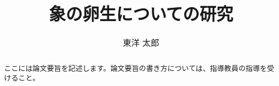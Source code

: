 \documentclass[bachelor]{INIAD}%
\title{象の卵生についての研究}
\author{東洋 太郎}
\begin{document}
\maketitle%

\frontmatter%



\begin{abstract}%
 ここには論文要旨を記述します。論文要旨の書き方については、指導教員の指導を受けること。
\end{abstract}

{\makeatletter
\let\ps@jpl@in\ps@empty
\makeatother
\pagestyle{empty}
\tableofcontents
\clearpage}

\mainmatter%



\backmatter%


\appendix%
\end{document}
